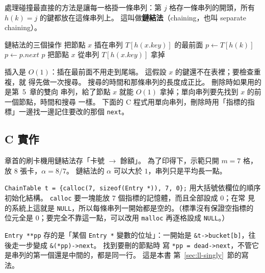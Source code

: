 處理碰撞最直接的方法是讓每一格掛一條串列：第 $j$ 格存一條串列的開頭，所有
$h(k) = j$ 的鍵都放在這條串列上。 這叫做\textbf{鏈結法}（chaining，也叫
separate chaining）。

\begin{pseudo}[label=alg:hash-chain]{鏈結法的三個操作}
    \State 把節點 $x$ 插在串列 $T[h(x.\mathit{key})]$ 的最前面
\EndProcedure
{}
    \State $p \gets T[h(k)]$
        \State $p \gets p.\mathit{next}$
    \EndWhile
    \State \Return $p$
\EndFunction
{}
    \State 把節點 $x$ 從串列 $T[h(x.\mathit{key})]$ 拿掉
\EndProcedure
\end{pseudo}

插入是 $O(1)$：插在最前面不用走到尾端。 這假設 $x$ 的鍵還不在表裡；要檢查重複，就
得先做一次搜尋。 搜尋的時間和那條串列的長度成正比。 刪除時如果用的是第~5~章的雙向
串列，給了節點 $x$ 就能 $O(1)$ 拿掉；單向串列要先找到 $x$ 的前一個節點，時間和搜尋
一樣。 下面的 C 程式用單向串列，刪除時用「指標的指標」一邊找一邊記住要改的那個
\texttt{next}。

\subsection{C 實作}
\label{sec:hash-chain-c}

章首的刷卡機用鏈結法存「卡號 $\to$ 餘額」。 為了印得下，示範只開 $m = 7$ 格，放
$8$ 張卡，$\alpha = 8/7$。 鏈結法的 $\alpha$ 可以大於 $1$，串列只是平均長一點。

\begin{cbookrecap}[第~14~章 14.3、14.5 節，第~19~章 19.3、19.9、19.10 節]
\texttt{ChainTable t = \{calloc(7, sizeof(Entry *)), 7, 0\};} 用大括號依欄位的順序
初始化結構。 \texttt{calloc} 要一塊能放 $7$ 個指標的記憶體，而且全部設成 $0$；在常
見的系統上這就是 \texttt{NULL}，所以每條串列一開始都是空的。（標準沒有保證空指標的
位元全是 $0$；要完全不靠這一點，可以改用 \texttt{malloc} 再逐格設成 \texttt{NULL}。）

\texttt{Entry **pp} 存的是「某個 \texttt{Entry *} 變數的位址」：一開始是
\texttt{\&t->bucket[b]}，往後走一步變成 \texttt{\&(*pp)->next}。 找到要刪的節點時
寫 \texttt{*pp = dead->next}，不管它是串列的第一個還是中間的，都是同一行。 這是本書
第~\ref{sec:ll-singly}~節的寫法。
\end{cbookrecap}

